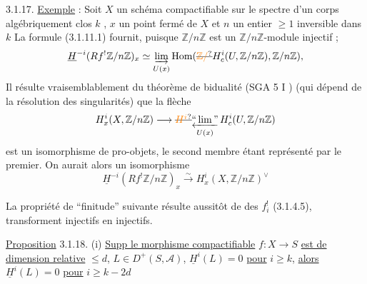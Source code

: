 3.1.17. \uline{Exemple} :
Soit $X$ un schéma compactifiable sur le spectre d'un corps algébriquement clos $k$ , $x$ un point fermé de $X$ et $n$ un entier $\geq1$ inversible dans $k$ La formule (3.1.11.1) fournit, puisque $\mathbb Z/n\mathbb Z$ est un $\mathbb Z/n\mathbb Z$-module injectif ; 
\[
 \underline H^{-i}(Rf^!\mathbb Z/n\mathbb Z)_x
 \simeq\underset{U(x)}{\underrightarrow{\lim}}\,
 \mathrm{Hom}(\deleted{\unsure{\mathbb Z/}}H_c^i(U,\mathbb Z/n\mathbb Z),\mathbb Z/n\mathbb Z),
\]
Il résulte vraisemblablement du théorème de bidualité (SGA 5 I \qquad) (qui dépend de la résolution des singularités)
que la flèche\unsure{/}
\[
 H_x^i(X,\mathbb Z/n\mathbb Z)\longrightarrow
 \deleted{\unsure{H^i}}\underset{U(x)}{\underleftarrow{\text{``}\lim\text{''}}}\,
 H_c^i(U,\mathbb Z/n\mathbb Z)
\]
est un isomorphisme de pro-objets, le second membre étant représenté par le premier. On aurait alors un isomorphisme
\[
 \underline H^{-i}(Rf^!\mathbb Z/n\mathbb Z)_x
 \xrightarrow{\sim} H_x^i(X,\mathbb Z/n\mathbb Z)^\vee
\]

La propriété de ``finitude'' suivante résulte aussitôt  de  des  $f_i^!$ (3.1.4.5),  transforment injectifs en injectifs.

\uline{Proposition} 3.1.18. (i) \uline{Supp le morphisme compactifiable} $f:X\longrightarrow S$ \uline{est de dimension relative} $\leq d$,   $L\in D^+(S,\mathcal A)$,   $\underline H^i(L)=0$ \uline{pour} $i\geq k$, \uline{alors} $\underline H^i(L)=0$ \uline{pour} $i\geq k-2d$


